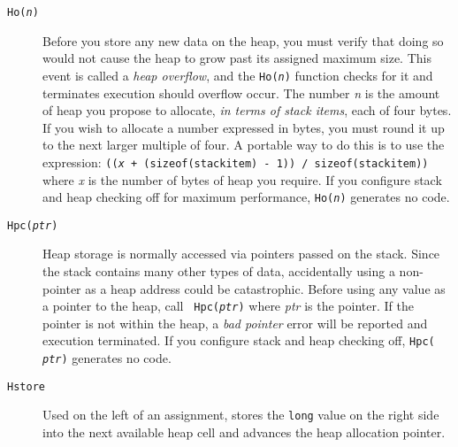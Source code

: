 \documentclass[twocolumn]{article}
\begin{document}
\begin{description}
\item[{\tt Ho({\em n})}]        Before you store any new data on the
                                heap, you must verify that doing so
                                would not cause the heap to grow past
                                its assigned maximum size.  This event
                                is called a {\em heap overflow}, and
                                the {\tt Ho({\em n})} function checks
                                for it and terminates execution should
                                overflow occur.  The number {\em n} is
                                the amount of heap you propose to
                                allocate, {\em in terms of stack
                                items}, each of four bytes.  If you
                                wish to allocate a number expressed in
                                bytes, you must round it up to the
                                next larger multiple of four.  A
                                portable way to do this is to use the
                                expression: {\tt (({\em x} +
                                (sizeof(stackitem) - 1)) /
                                sizeof(stackitem))} where {\em x} is
                                the number of bytes of heap you
                                require.  If you configure stack and
                                heap checking off for maximum
                                performance, {\tt Ho({\em n})} generates
                                no code.
\item[{\tt Hpc({\em ptr})}]     Heap storage is normally accessed via
                                pointers passed on the stack.  Since
                                the stack contains many other types of
                                data, accidentally using a non-pointer
                                as a heap address could be
                                catastrophic.  Before using any value
                                as a pointer to the heap, call {\tt
                                Hpc({\em ptr})} where {\em ptr} is the
                                pointer.  If the pointer is not within
                                the heap, a {\em bad pointer} error
                                will be reported and execution
                                terminated.  If you configure stack
                                and heap checking off, {\tt Hpc({\em
                                ptr})} generates no code.
\item[{\tt Hstore}]             Used on the left of an assignment,
                                stores the {\tt long} value on the
                                right side into the next available
                                heap cell and advances the heap
                                allocation pointer.
\end{description}
\end{document}
